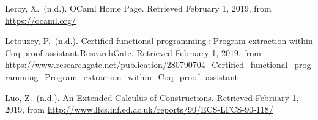 \documentclass[12pt,twoside]{article}
\begin{document}
{\begin{thebibliography}{222}
\mdbibitemlabel{}Leroy, X.~(n.d.). OCaml Home Page. Retrieved February 1, 2019, from \href{https://ocaml.org/}{{\ttfamily https://\hspace{0pt}ocaml.\hspace{0pt}org/\hspace{0pt}}}\label{leroy_ocaml_nodate}%

\mdbibitemlabel{}Letouzey, P.~(n.d.). Certified functional programming : Program extraction within Coq proof assistant.ResearchGate. Retrieved February 1, 2019, from \href{https://www.researchgate.net/publication/280790704_Certified_functional_programming_Program_extraction_within_Coq_proof_assistant}{{\ttfamily https://\hspace{0pt}www.\hspace{0pt}researchgate.\hspace{0pt}net/\hspace{0pt}publication/\hspace{0pt}280790704\_\hspace{0pt}Certified\_\hspace{0pt}functional\_\hspace{0pt}programming\_\hspace{0pt}Program\_\hspace{0pt}extraction\_\hspace{0pt}within\_\hspace{0pt}Coq\_\hspace{0pt}proof\_\hspace{0pt}assistant}}\label{letouzey_certified_nodate}%

\mdbibitemlabel{}Luo, Z.~(n.d.). An Extended Calculus of Constructions. Retrieved February 1, 2019, from \href{http://www.lfcs.inf.ed.ac.uk/reports/90/ECS-LFCS-90-118/}{{\ttfamily http://\hspace{0pt}www.\hspace{0pt}lfcs.\hspace{0pt}inf.\hspace{0pt}ed.\hspace{0pt}ac.\hspace{0pt}uk/\hspace{0pt}reports/\hspace{0pt}90/\hspace{0pt}ECS-\hspace{0pt}LFCS-\hspace{0pt}90-\hspace{0pt}118/\hspace{0pt}}}\label{luo_extended_nodate}%


\end{thebibliography}}
\end{document}
